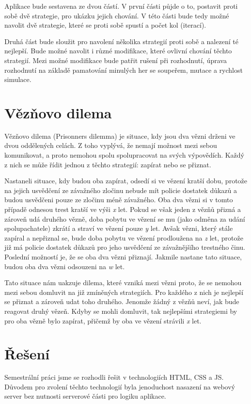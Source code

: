 \documentclass[12pt, a4paper]{article}
\begin{document}
Aplikace bude sestavena ze dvou částí. V první části půjde o to, postavit proti sobě dvě strategie, pro ukázku jejich chování. V této části bude tedy
 možné navolit dvě strategie, které se proti sobě spustí a počet kol (iterací).

Druhá část bude sloužit pro navolení několika strategií proti sobě a nalezení té nejlepší. Bude možné navolit i různé modifikace, které ovlivní chování těchto strategií. Mezi
možné modifikace bude patřit rušení při rozhodnutí, úprava rozhodnutí na základě pamatování minulých her se soupeřem, mutace a rychlost simulace.

\section{Vězňovo dilema}

\noindent Vězňovo dilema (Prisonner\textquotesingle s dilemma) je situace, kdy jsou dva vězni drženi ve dvou oddělených celách. Z toho vyplývá, že nemají možnost mezi sebou komunikovat, a proto nemohou spolu spolupracovat na svých výpovědích. Každý z nich se může řídit jednou z těchto strategií: zapírat nebo se přiznat.

Nastane\-li situace, kdy budou oba zapírat, odsedí si ve vězení kratší dobu, protože na jejich usvědčení ze závažného zločinu nebude mít policie dostatek důkazů a budou usvědčeni pouze ze zločinu méně závažného. Oba dva vězni si v tomto případě odnesou trest kratší ve výši \textit{x} let. Pokud se však jeden z vězňů přizná a zároveň udá druhého vězně, doba pobytu ve vězení se mu (jako odměna za udání spolupachatele) zkrátí a straví ve vězení pouze \textit{y} let. Avšak vězni, který stále zapíral a nepřiznal se, bude doba pobytu ve vězení prodloužena na \textit{z} let, protože již má policie dostatek důkazů pro jeho usvědčení ze závažnějšího trestného činu. Poslední možností je, že se oba dva vězni přiznají. Jakmile nastane tato situace, budou oba dva vězni odsouzeni na \textit{w} let.

Tato situace nám uakzuje dilema, které vzniká mezi vězni proto, že se nemohou mezi sebou domluvit na již zmíněných strategiích. Pro každého z nich je nejlepší se přiznat a zároveň udat toho druhého. Jenomže žádný z vězňů neví, jak bude reagovat druhý vězeň. Kdyby se mohli domluvit, tak nejlepšími strategiemi by pro oba vězně bylo zapírat, přičemž by oba ve vězení strávili \textit{x} let.

\section{Řešení}
\noindent Semestrální práci jsme se rozhodli řešit v technologiích HTML, CSS a JS. Důvodem pro zvolení těchto technologií byla jenoduchost nasazení na webový server bez nutnosti
serverové části pro logiku aplikace.
\end{document}
